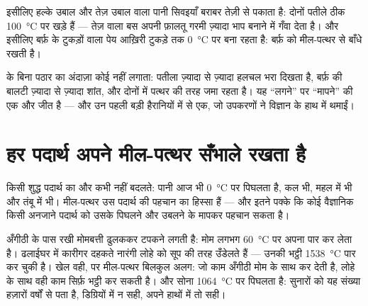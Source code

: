 \begin{example}[रसोई में पठार]\label{ex:g4:changes-of-state:kitchen}
इसीलिए हल्के उबाल और तेज़ उबाल वाला पानी सिवइयाँ बराबर तेज़ी से पकाता
है: दोनों पतीले ठीक \qty{100}{\celsius} पर खड़े हैं --- तेज़ वाला बस
अपनी फ़ालतू गरमी ज़्यादा भाप बनाने में गँवा देता है। और इसीलिए बर्फ़
के टुकड़ों वाला पेय आख़िरी टुकड़े तक \qty{0}{\celsius} पर बना रहता
है:  बर्फ़  को मील-पत्थर से बाँधे रखती है।
\end{example}

\begin{remark}[आँख जिसे देख ही नहीं सकती]\label{rem:g4:changes-of-state:invisible}
 के बिना पठार का अंदाज़ा कोई नहीं लगाता: पतीला ज़्यादा से
ज़्यादा हलचल भरा दिखता है, बर्फ़ की बालटी ज़्यादा से ज़्यादा शांत,
और दोनों में  पत्थर की तरह जमा रहता है। यह ``लगने'' पर ``मापने''
की एक और जीत है --- और उन पहली बड़ी हैरानियों में से एक, जो उपकरणों ने
विज्ञान के हाथ में थमाईं।
\end{remark}

\section{हर पदार्थ अपने मील-पत्थर सँभाले रखता है}

\begin{proposition}[मील-पत्थर पहचान के निशान हैं]\label{prop:g4:changes-of-state:identity}
किसी शुद्ध पदार्थ का  और  कभी नहीं बदलते: पानी आज भी
\qty{0}{\celsius} पर पिघलता है, कल भी, महल में भी और तंबू में भी।
मील-पत्थर उस पदार्थ की पहचान का हिस्सा हैं --- और इतने पक्के कि कोई
वैज्ञानिक किसी अनजाने पदार्थ को उसके पिघलने और उबलने के  मापकर
पहचान सकता है।
\end{proposition}

\begin{example}\label{ex:g4:changes-of-state:foundry}
अँगीठी के पास रखी मोमबत्ती ढुलककर टपकने लगती है: मोम लगभग
\qty{60}{\celsius} पर अपना  पार कर लेता है। ढलाईघर में
कारीगर दहकते नारंगी  लोहे को सूप की तरह उँडेलते हैं --- उनकी
भट्ठी \qty{1538}{\celsius} पार कर चुकी है। खेल वही, पर मील-पत्थर
बिलकुल अलग: जो काम अँगीठी मोम के साथ कर देती है, लोहे के साथ वही काम
सिर्फ़ भट्ठी कर सकती है। और सोना \qty{1064}{\celsius} पर पिघलता है:
सुनारों को यह संख्या हज़ारों वर्षों से पता है, डिग्रियों में न सही,
अपने हाथों में तो सही।
\end{example}

